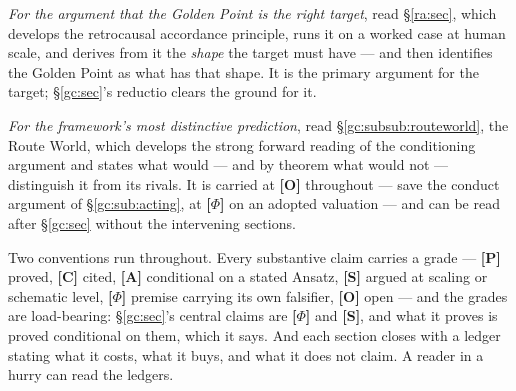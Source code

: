 \documentclass[11pt]{article}
\numberwithin{equation}{section}
\theoremstyle{plain}
\theoremstyle{definition}
\theoremstyle{remark}
\begin{document}
\emph{For the argument that the Golden Point is the right target}, read
\S\ref{ra:sec}, which develops the retrocausal accordance principle,
runs it on a worked case at human scale, and derives from it the
\emph{shape} the target must have --- and then identifies the Golden
Point as what has that shape. It is the primary argument for the target;
\S\ref{gc:sec}'s reductio clears the ground for it.

\emph{For the framework's most distinctive prediction}, read
\S\ref{gc:subsub:routeworld}, the Route World, which develops the strong
forward reading of the conditioning argument and states what would ---
and by theorem what would not --- distinguish it from its rivals. It is
carried at \textbf{[O]} throughout --- save the conduct argument of
\S\ref{gc:sub:acting}, at \textbf{[$\Phi$]} on an
adopted valuation --- and can be read after \S\ref{gc:sec}
without the intervening sections.

Two conventions run throughout. Every substantive claim carries a grade
--- \textbf{[P]} proved, \textbf{[C]} cited, \textbf{[A]} conditional on a
stated Ansatz, \textbf{[S]} argued at scaling or schematic level,
\textbf{[$\Phi$]} premise carrying its own falsifier, \textbf{[O]} open --- and the grades are load-bearing:
\S\ref{gc:sec}'s central claims are \textbf{[$\Phi$]} and \textbf{[S]},
and what it proves is proved conditional on them, which it says. And each
section closes with a ledger stating what it costs, what it buys, and
what it does not claim. A reader in a hurry can read the ledgers.


%
\end{document}
